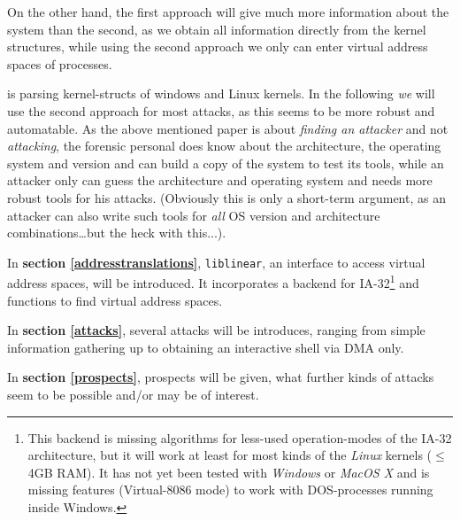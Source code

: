 On the other hand, the first approach will give much more information about the
system than the second, as we obtain all information directly from the kernel
structures, while using the second approach we only can enter virtual address
spaces of processes.

\cite{finding_digital_evidence_in_physical_memory:2006} is parsing
kernel-structs of windows and Linux kernels. In the following \emph{we} will use
the second approach for most attacks, as this seems to be more robust and
automatable.  As the above mentioned paper is about \emph{finding an attacker}
and not \emph{attacking}, the forensic personal does know about the
architecture, the operating system and version and can build a copy of the
system to test its tools, while an attacker only can guess the architecture and
operating system and needs more robust tools for his attacks.  (Obviously this
is only a short-term argument, as an attacker can also write such tools for
\emph{all} OS version and architecture combinations\ldots but the heck with
this...).



In \textbf{section \ref{addresstranslations}}, \texttt{liblinear}, an interface
to access virtual address spaces, will be introduced. It incorporates a backend
for IA-32\footnote{This backend is missing algorithms for less-used
operation-modes of the IA-32 architecture, but it will work at least for most
kinds of the \emph{Linux} kernels ($\leq$ 4GB RAM). It has not yet been tested
with \emph{Windows} or \emph{MacOS X} and is missing features (Virtual-8086
mode) to work with DOS-processes running inside Windows.} and functions to find
virtual address spaces.



In \textbf{section \ref{attacks}}, several attacks will be introduces, ranging
from simple information gathering up to obtaining an interactive shell via DMA
only. 



In \textbf{section \ref{prospects}}, prospects will be given, what further kinds
of attacks seem to be possible and/or may be of interest.

